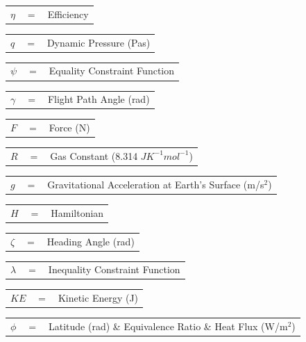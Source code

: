 \begin{tabular}{p{0.8cm}p{0.8cm}p{5.6cm}}
	$\eta$ & $=$ & Efficiency\\
\end{tabular} 
\begin{tabular}{p{0.8cm}p{0.8cm}p{5.6cm}}
	$q$ & $=$ & Dynamic Pressure (Pas)\\  
\end{tabular}     
\begin{tabular}{p{0.8cm}p{0.8cm}p{5.6cm}}
	$\psi$ & $=$ & Equality Constraint Function\\
\end{tabular}
\begin{tabular}{p{0.8cm}p{0.8cm}p{5.6cm}}
	$\gamma$ & $=$ & Flight Path Angle (rad)\\
\end{tabular} 
\begin{tabular}{p{0.8cm}p{0.8cm}p{5.6cm}}
	$F$ & $=$ & Force (N)\\
\end{tabular} 
\begin{tabular}{p{0.8cm}p{0.8cm}p{5.6cm}}
	$R$ & $=$ & Gas Constant (8.314 $J K^{-1} mol^{-1}$)\\
\end{tabular} 
\begin{tabular}{p{0.8cm}p{0.8cm}p{5.6cm}}
	$g$ & $=$ & Gravitational Acceleration at Earth's Surface (m/s$^2$)\\
\end{tabular}
\begin{tabular}{p{0.8cm}p{0.8cm}p{5.6cm}}
	$H$ & $=$ & Hamiltonian\\
\end{tabular}
\begin{tabular}{p{0.8cm}p{0.8cm}p{5.6cm}}
	$\zeta$ & $=$ & Heading Angle (rad)\\
\end{tabular}
\begin{tabular}{p{0.8cm}p{0.8cm}p{5.6cm}}
	$\lambda$ & $=$ & Inequality Constraint Function\\
\end{tabular}
\begin{tabular}{p{0.8cm}p{0.8cm}p{5.6cm}}
	$KE$ & $=$ & Kinetic Energy (J)\\
\end{tabular} 
\begin{tabular}{p{0.8cm}p{0.8cm}p{5.6cm}}
	$\phi$ & $=$ & Latitude (rad) \& Equivalence Ratio \& Heat Flux (W/m$^2$)\\
\end{tabular}

